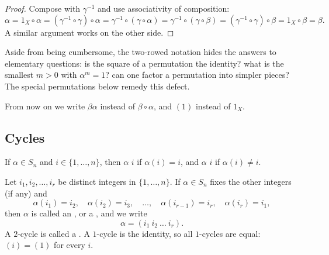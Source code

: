 \begin{proof}
	Compose with \(\gamma^{-1}\) and use associativity of composition:
	\[
		\alpha
		= 1_X \circ \alpha
		= (\gamma^{-1}\circ\gamma) \circ \alpha
		= \gamma^{-1} \circ (\gamma \circ \alpha)
		= \gamma^{-1} \circ (\gamma \circ \beta)
		= (\gamma^{-1}\circ\gamma) \circ \beta
		= 1_X \circ \beta = \beta.
	\]
	A similar argument works on the other side.
\end{proof}

Aside from being cumbersome, the two-rowed notation hides the answers to elementary
questions: is the square of a permutation the identity? what is the smallest \(m > 0\)
with \(\alpha^m = 1\)? can one factor a permutation into simpler pieces? The special
permutations below remedy this defect.

\begin{notation}
	From now on we write \(\beta\alpha\) instead of \(\beta \circ \alpha\), and \((1)\)
	instead of \(1_X\).
\end{notation}

\subsection{Cycles}

\begin{definition}
	If \(\alpha \in S_n\) and \(i \in \{1, \dots, n\}\), then \(\alpha\)  \(i\)
	if \(\alpha(i) = i\), and \(\alpha\)  \(i\) if \(\alpha(i) \neq i\).
\end{definition}

\begin{definition}[Cycle]
	Let \(i_1, i_2, \dots, i_r\) be distinct integers in \(\{1, \dots, n\}\). If
	\(\alpha \in S_n\) fixes the other integers (if any) and
	\[
		\alpha(i_1) = i_2, \quad \alpha(i_2) = i_3, \quad \dots, \quad
		\alpha(i_{r-1}) = i_r, \quad \alpha(i_r) = i_1,
	\]
	then \(\alpha\) is called an , or a ,
	and we write
	\[
		\alpha = (i_1\ i_2\ \dots\ i_r).
	\]
	A \(2\)-cycle is called a . A \(1\)-cycle is the identity, so all
	\(1\)-cycles are equal: \((i) = (1)\) for every \(i\).
\end{definition}


